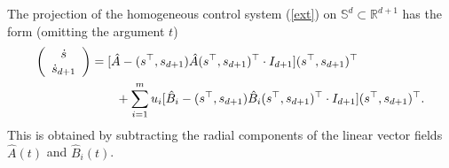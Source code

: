 \documentclass{siamltex}%
\begin{document}
The projection of the homogeneous control system (\ref{ext}) on $\mathbb{S}%
^{d}\subset\mathbb{R}^{d+1}$ has the form (omitting the argument $t$)%
\begin{align*}
\left(
\begin{array}
[c]{c}%
\dot{s}\\
\dot{s}_{d+1}%
\end{array}
\right)   &  =[\hat{A}-(s^{\top},s_{d+1})\hat{A}(s^{\top},s_{d+1})^{\top}\cdot
I_{d+1}](s^{\top},s_{d+1})^{\top}\\
&  \qquad+\sum_{i=1}^{m}u_{i}[\hat{B}_{i}-(s^{\top},s_{d+1})\hat{B}%
_{i}(s^{\top},s_{d+1})^{\top}\cdot I_{d+1}](s^{\top},s_{d+1})^{\top}.
\end{align*}
This is obtained by subtracting the radial components of the linear vector
fields $\hat{A}(t)$ and $\hat{B}_{i}(t)$.
\end{document}
